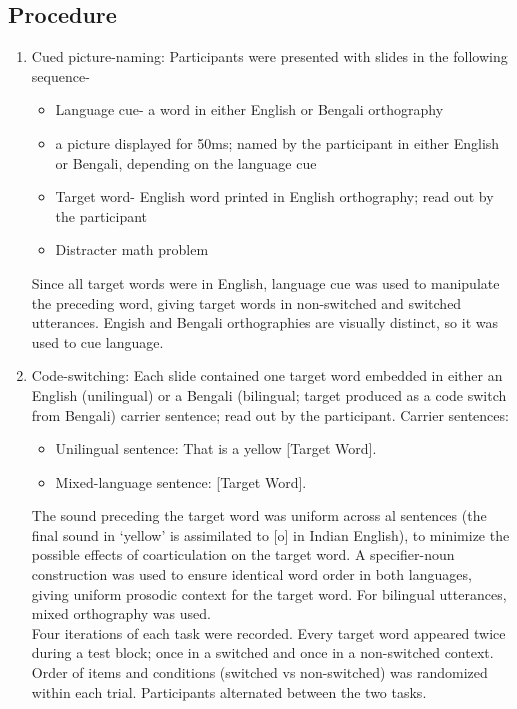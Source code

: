 \documentclass[11pt]{article}
\begin{document}
\subsection{Procedure}
\begin{enumerate}[]
	\item Cued picture-naming: Participants were presented with slides in the following sequence-
	\begin{itemize}
		\item Language cue- a word in either English or Bengali orthography
		\item a picture displayed for 50ms; named by the participant in either English or Bengali, depending on the language cue 
		\item Target word- English word printed in English orthography; read out by the participant
		\item Distracter math problem
	\end{itemize}
	Since all target words were in English, language cue was used to manipulate the preceding word, giving target words in non-switched and switched utterances. Engish and Bengali orthographies are visually distinct, so it was used to cue language.
	\item Code-switching: Each slide contained one target word embedded in either an English (unilingual) or a Bengali (bilingual; target produced as a code switch from Bengali) carrier sentence; read out by the participant. Carrier sentences:
	\begin{itemize}
		\item Unilingual sentence: That is a yellow [Target Word].
		\item Mixed-language sentence:  [Target Word].
	\end{itemize}
	
	The sound preceding the target word was uniform across al sentences (the final sound in ‘yellow’ is assimilated to [o] in Indian English), to minimize the possible effects of coarticulation on the target word. A specifier-noun construction was used to ensure identical word order in both languages, giving uniform prosodic context for the target word. For bilingual utterances, mixed orthography was used. \\
	Four iterations of each task were recorded. Every target word appeared twice during a test block; once in a switched and once in a non-switched context. Order of items and conditions (switched vs non-switched) was randomized within each trial. Participants alternated between the two tasks.
	
\end{enumerate}
\end{document}

